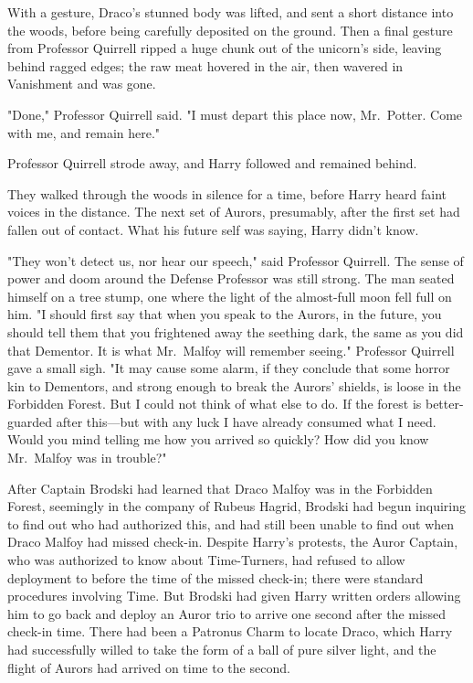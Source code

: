 With a gesture, Draco's stunned body was lifted, and sent a short distance into the woods, before being carefully deposited on the ground. Then a final gesture from Professor Quirrell ripped a huge chunk out of the unicorn's side, leaving behind ragged edges; the raw meat hovered in the air, then wavered in Vanishment and was gone.

"Done," Professor Quirrell said. "I must depart this place now, Mr.~Potter. Come with me, and remain here."

Professor Quirrell strode away, and Harry followed and remained behind.

They walked through the woods in silence for a time, before Harry heard faint voices in the distance. The next set of Aurors, presumably, after the first set had fallen out of contact. What his future self was saying, Harry didn't know.

"They won't detect us, nor hear our speech," said Professor Quirrell. The sense of power and doom around the Defense Professor was still strong. The man seated himself on a tree stump, one where the light of the almost-full moon fell full on him. "I should first say that when you speak to the Aurors, in the future, you should tell them that you frightened away the seething dark, the same as you did that Dementor. It is what Mr.~Malfoy will remember seeing." Professor Quirrell gave a small sigh. "It may cause some alarm, if they conclude that some horror kin to Dementors, and strong enough to break the Aurors' shields, is loose in the Forbidden Forest. But I could not think of what else to do. If the forest is better-guarded after this---but with any luck I have already consumed what I need. Would you mind telling me how you arrived so quickly? How did you know Mr.~Malfoy was in trouble?"

After Captain Brodski had learned that Draco Malfoy was in the Forbidden Forest, seemingly in the company of Rubeus Hagrid, Brodski had begun inquiring to find out who had authorized this, and had still been unable to find out when Draco Malfoy had missed check-in. Despite Harry's protests, the Auror Captain, who was authorized to know about Time-Turners, had refused to allow deployment to before the time of the missed check-in; there were standard procedures involving Time. But Brodski had given Harry written orders allowing him to go back and deploy an Auror trio to arrive one second after the missed check-in time. There had been a Patronus Charm to locate Draco, which Harry had successfully willed to take the form of a ball of pure silver light, and the flight of Aurors had arrived on time to the second.


